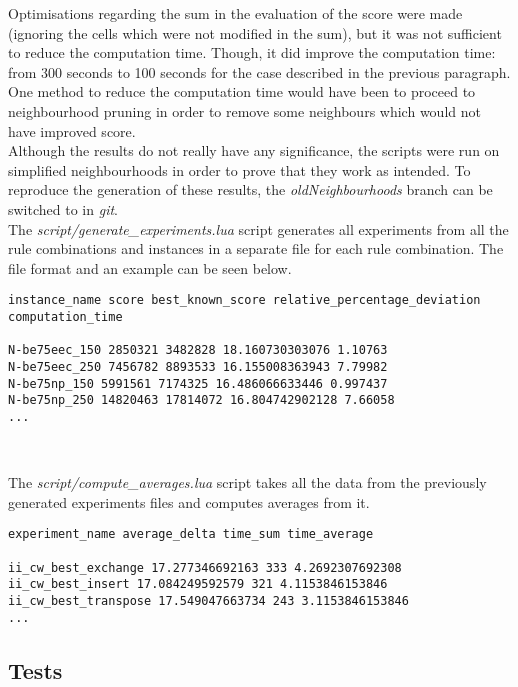 Optimisations regarding the sum in the evaluation of the score were made
(ignoring the cells which were not modified in the sum), but it was not
sufficient to reduce the computation time. Though, it did improve the
computation time: from 300 seconds to 100 seconds for the case described in the
previous paragraph.\\

One method to reduce the computation time would have been to proceed to
neighbourhood pruning in order to remove some neighbours which would not have
improved score.\\

Although the results do not really have any significance, the scripts were run
on simplified neighbourhoods in order to prove that they work as intended. To
reproduce the generation of these results, the \emph{oldNeighbourhoods} branch
can be switched to in \emph{git}.\\

The \emph{script/generate\_experiments.lua} script generates all experiments from
all the rule combinations and instances in a separate file for each rule
combination. The file format and an example can be seen below.\\

\begin{lstlisting}
instance_name score best_known_score relative_percentage_deviation computation_time

N-be75eec_150 2850321 3482828 18.160730303076 1.10763
N-be75eec_250 7456782 8893533 16.155008363943 7.79982
N-be75np_150 5991561 7174325 16.486066633446 0.997437
N-be75np_250 14820463 17814072 16.804742902128 7.66058
...
\end{lstlisting}
\

The \emph{script/compute\_averages.lua} script takes all the data from the
previously generated experiments files and computes averages from it.\\

\begin{lstlisting}
experiment_name average_delta time_sum time_average

ii_cw_best_exchange 17.277346692163 333 4.2692307692308
ii_cw_best_insert 17.084249592579 321 4.1153846153846
ii_cw_best_transpose 17.549047663734 243 3.1153846153846
...
\end{lstlisting}

\newpage

\subsection{Tests}
\newpage
